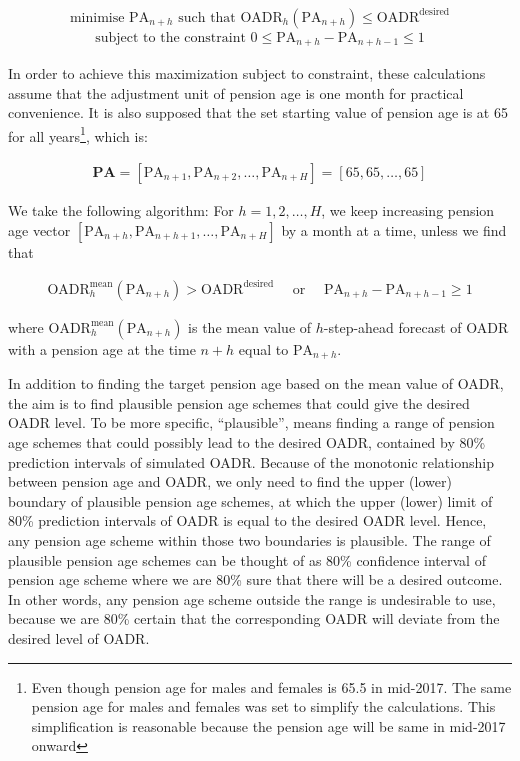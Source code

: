 \documentclass[11pt,a4paper,]{article}
\begin{document}
\begin{equation*}
  \text{minimise~} \text{PA}_{n+h}  \text{~such that~} \text{OADR}_h(\text{PA}_{n+h})\leq \text{OADR}^{\text{desired}}
\end{equation*}\begin{align*}
  \text{subject to the constraint~} 0\leq \text{PA}_{n+h}-\text{PA}_{n+h-1}\leq 1
\end{align*}

In order to achieve this maximization subject to constraint, these
calculations assume that the adjustment unit of pension age is one month
for practical convenience. It is also supposed that the set starting
value of pension age is at 65 for all
years\footnote{Even though pension age for males and females is 65.5 in mid-2017. The same pension age for males and females was set to simplify the calculations. This simplification is reasonable because the pension age will be same in mid-2017 onward},
which is: \vspace{-.3in}

\begin{align*}
  \bm{\text{PA}}=\left[\text{PA}_{n+1},\text{PA}_{n+2},\dots,\text{PA}_{n+H}\right] = \left[65,65,\dots,65\right]
\end{align*}

We take the following algorithm: For \(h=1,2,\dots,H\), we keep
increasing pension age vector
\([\text{PA}_{n+h},\text{PA}_{n+h+1},\dots,\text{PA}_{n+H}]\) by a month
at a time, unless we find that \vspace{-.2in}

\begin{align*}
  \text{OADR}^{\text{mean}}_h(\text{PA}_{n+h})> \text{OADR}^{\text{desired}} \quad \text{~or~}\quad  \text{PA}_{n+h}-\text{PA}_{n+h-1}\geq 1
\end{align*}

where \(\text{OADR}^{\text{mean}}_h(\text{PA}_{n+h})\) is the mean value
of \(h\)-step-ahead forecast of OADR with a pension age at the time
\(n+h\) equal to \(\text{PA}_{n+h}\).

In addition to finding the target pension age based on the mean value of
OADR, the aim is to find plausible pension age schemes that could give
the desired OADR level. To be more specific, ``plausible'', means
finding a range of pension age schemes that could possibly lead to the
desired OADR, contained by 80\% prediction intervals of simulated OADR.
Because of the monotonic relationship between pension age and OADR, we
only need to find the upper (lower) boundary of plausible pension age
schemes, at which the upper (lower) limit of 80\% prediction intervals
of OADR is equal to the desired OADR level. Hence, any pension age
scheme within those two boundaries is plausible. The range of plausible
pension age schemes can be thought of as 80\% confidence interval of
pension age scheme where we are 80\% sure that there will be a desired
outcome. In other words, any pension age scheme outside the range is
undesirable to use, because we are 80\% certain that the corresponding
OADR will deviate from the desired level of OADR.
\end{document}
